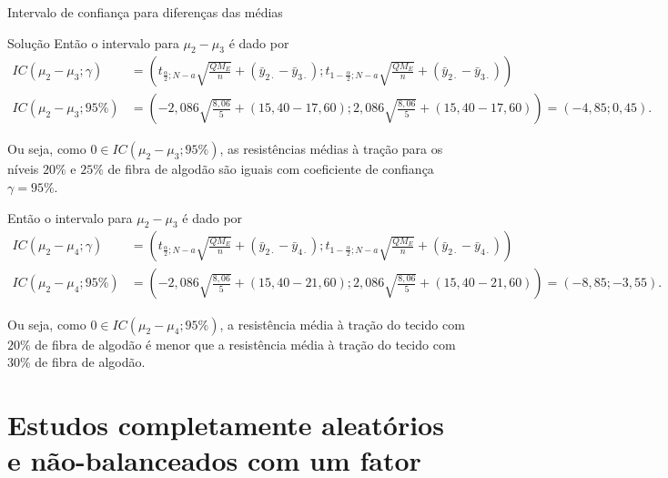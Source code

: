\documentclass[8pt]{beamer}
\begin{document}
\begin{frame}{Intervalo de confiança para diferenças das médias}

\footnotesize
\begin{block}{Solução}
Então o intervalo para $\mu_2 - \mu_3$ é dado por
\begin{align*}
IC(\mu_2 - \mu_3; \gamma) &= \left(t_{\frac{\alpha}{2}; N - a} \sqrt{\frac{QM_E}{n}} + (\bar{y}_{2\cdot} - \bar{y}_{3\cdot}); t_{1-\frac{\alpha}{2}; N - a} \sqrt{\frac{QM_E}{n}} + (\bar{y}_{2\cdot} - \bar{y}_{3\cdot})  \right)\\
IC(\mu_2 - \mu_3; 95\%) &= \left( -2,086 \sqrt{\frac{8,06}{5}} + (15,40 - 17,60); 2,086 \sqrt{\frac{8,06}{5}} + (15,40 - 17,60) \right) = \left( -4,85; 0,45 \right).
\end{align*}

Ou seja, como $0 \in IC(\mu_2 - \mu_3; 95\%)$, as resistências médias à tração para os níveis $20\%$ e $25\%$ de fibra de algodão são iguais com coeficiente de confiança $\gamma= 95\%$.
\vfill

Então o intervalo para $\mu_2 - \mu_3$ é dado por
\begin{align*}
IC(\mu_2 - \mu_4; \gamma) &= \left(t_{\frac{\alpha}{2}; N - a} \sqrt{\frac{QM_E}{n}} + (\bar{y}_{2\cdot} - \bar{y}_{4\cdot}); t_{1-\frac{\alpha}{2}; N - a} \sqrt{\frac{QM_E}{n}} + (\bar{y}_{2\cdot} - \bar{y}_{4\cdot})  \right)\\
IC(\mu_2 - \mu_4; 95\%) &= \left( -2,086 \sqrt{\frac{8,06}{5}} + (15,40 - 21,60); 2,086 \sqrt{\frac{8,06}{5}} + (15,40 - 21,60) \right) = \left( -8,85; -3,55 \right).
\end{align*}

Ou seja, como $0 \in IC(\mu_2 - \mu_4; 95\%)$, a resistência média à tração do tecido com $20\%$ de fibra de algodão é menor que a resistência média à tração do tecido com $30\%$ de fibra de algodão.

\end{block}
\normalsize
\end{frame}

\section{Estudos completamente aleatórios e não-balanceados com um fator}
\end{document}
